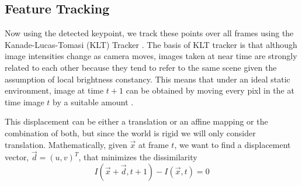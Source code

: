 \subsection{Feature Tracking}
\label{sec:feature-tracking}
Now using the detected keypoint, we track these points over all frames
using the Kanade-Lucas-Tomasi (KLT) Tracker \cite{KLT}.
The basis of KLT tracker is that although image intensities change as
camera moves, images taken at near time are strongly related to each
other because they tend to refer to the same scene given the
assumption of local brightness constancy. This means that under an ideal
static environment, image at time $t+1$ can be obtained by moving
every pixl in the at time image $t$ by a suitable amount \cite{shi}. 

This displacement can be either a translation or an affine mapping or
the combination of both, but since the world is rigid we will only
consider translation. Mathematically, given $\vec x$ at frame $t$, we
want to find a displacement vector, $\vec d=(u,v)^T$, that minimizes
the dissimilarity
\begin{equation}
  \label{eq:1}
 I(\vec x + \vec d, t+1) - I(\vec x, t) = 0
\end{equation}


